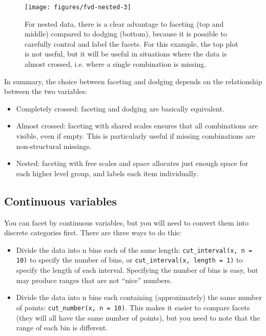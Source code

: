 \begin{Shaded}
\begin{Highlighting}[]
\StringTok{ }\NormalTok{(} 
\end{Highlighting}
\end{Shaded}

\begin{figure}
\texttt{[image: figures/fvd-nested-3]} \caption{For nested data, there is a clear advantage to faceting (top and middle) compared to dodging (bottom), because it is possible to carefully control and label the facets.  For this example, the top plot is not useful, but it will be useful in situations where the data is almost crossed, i.e. where a single combination is missing.\label{fig:fvd-nested3}}
\end{figure}

In summary, the choice between faceting and dodging depends on the
relationship between the two variables:

\begin{itemize}
\itemsep1pt\parskip0pt
\item
  Completely crossed: faceting and dodging are basically equivalent.
\item
  Almost crossed: faceting with shared scales ensures that all
  combinations are visible, even if empty. This is particularly useful
  if missing combinations are non-structural missings.
\item
  Nested: faceting with free scales and space allocates just enough
  space for each higher level group, and labels each item individually.
\end{itemize}

\subsection{Continuous variables}\label{sub:continuous-variables}

You can facet by continuous variables, but you will need to convert them
into discrete categories first. There are three ways to do this:

\begin{itemize}
\itemsep1pt\parskip0pt
\item
  Divide the data into n bins each of the same length:
  \texttt{cut\_interval(x, n = 10)} to specify the number of bins, or
  \texttt{cut\_interval(x, length = 1)} to specify the length of each
  interval. Specifying the number of bins is easy, but may produce
  ranges that are not ``nice'' numbers. 
\item
  Divide the data into n bins each containing (approximately) the same
  number of points: \texttt{cut\_number(x, n = 10)}. This makes it
  easier to compare facets (they will all have the same number of
  points), but you need to note that the range of each bin is different.
\end{itemize}


